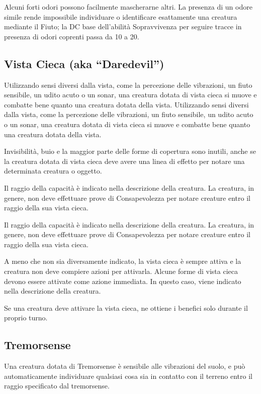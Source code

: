 \documentclass[a4paper,11pt,twoside,openany]{book}
\begin{document}
Alcuni forti odori possono facilmente mascherarne altri. La presenza di un odore simile rende impossibile individuare o identificare esattamente una creatura mediante il Fiuto; la DC base dell'abilità Sopravvivenza per seguire tracce in presenza di odori coprenti passa da 10 a 20.


\subsection{Vista Cieca (aka “Daredevil”)}

Utilizzando sensi diversi dalla vista, come la percezione delle vibrazioni, un fiuto sensibile, un udito acuto o un sonar, una creatura dotata di vista cieca si muove e combatte bene quanto una creatura dotata della vista.
Utilizzando sensi diversi dalla vista, come la percezione delle vibrazioni, un fiuto sensibile, un udito acuto o un sonar, una creatura dotata di vista cieca si muove e combatte bene quanto una creatura dotata della vista.

Invisibilità, buio e la maggior parte delle forme di copertura sono inutili, anche se la creatura dotata di vista cieca deve avere una linea di effetto per notare una determinata creatura o oggetto.

Il raggio della capacità è indicato nella descrizione della creatura. La creatura, in genere, non deve effettuare prove di Consapevolezza per notare creature entro il raggio della sua vista cieca.

Il raggio della capacità è indicato nella descrizione della creatura. La creatura, in genere, non deve effettuare prove di Consapevolezza per notare creature entro il raggio della sua vista cieca.

A meno che non sia diversamente indicato, la vista cieca è sempre attiva e la creatura non deve compiere azioni per attivarla. Alcune forme di vista cieca devono essere attivate come azione immediata. In questo caso, viene indicato nella descrizione della creatura.

Se una creatura deve attivare la vista cieca, ne ottiene i benefici solo durante il proprio turno.

\subsection{Tremorsense}
Una creatura dotata di Tremorsense è sensibile alle vibrazioni del suolo, e può automaticamente individuare qualsiasi cosa sia in contatto con il terreno entro il raggio specificato dal tremorsense.
\end{document}
